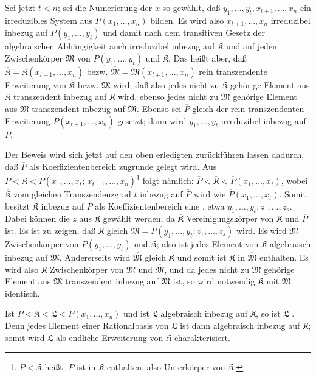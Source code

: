 Sei jetzt $t<n$; sei die Numerierung der $x$ so gewählt, daß $y_1,\ldots,y_t,x_{t+1},\ldots,x_n$ ein irreduzibles System aus $P(x_1,\ldots,x_n)$ bilden. Es wird also $x_{t+1},\ldots,x_n$ irreduzibel inbezug auf $P(y_1,\ldots,y_t)$ und damit nach dem transitiven Gesetz der algebraischen Abhängigkeit auch irreduzibel inbezug auf $\mathfrak K$ und auf jeden Zwischenkörper $\mathfrak M$ von $P(y_1,\ldots,y_t)$ und $\mathfrak K$. Das heißt aber, daß $\overline{\mathfrak K}=\mathfrak K(x_{t+1},\ldots,x_n)$ bezw. $\overline{\mathfrak M}=\mathfrak M(x_{t+1},\ldots,x_n)$ rein transzendente Erweiterung von $\mathfrak K$ bezw. $\mathfrak M$ wird; daß also jedes nicht zu $\mathfrak K$ gehörige Element aus $\overline{\mathfrak K}$ transzendent inbezug auf $\mathfrak K$ wird, ebenso jedes nicht zu $\mathfrak M$ gehörige Element aus $\overline{\mathfrak M}$ transzendent inbezug auf $\mathfrak M$. Ebenso sei $\overline P$ gleich der rein transzendenten Erweiterung $P(x_{t+1},\ldots,x_n)$ gesetzt; dann wird $y_1,\ldots,y_t$ irreduzibel inbezug auf $\overline P$.

Der Beweis wird sich jetzt auf den oben erledigten zurückführen lassen dadurch, daß $\overline P$ als Koeffizientenbereich zugrunde gelegt wird. Aus $P<\mathfrak K< P(x_1,\ldots,x_t;\,x_{t+1},\ldots,x_n)$\footnote{$P<\mathfrak K$ heißt: $P$ ist in $\mathfrak K$ enthalten, also Unterkörper von $\mathfrak K$.} folgt nämlich: $\overline P<\overline{\mathfrak K}<\overline P(x_1,\ldots,x_t)$, wobei $\overline{\mathfrak K}$ vom gleichen Transzendenzgrad $t$ inbezug auf $\overline P$ wird wie $\overline P(x_1,\ldots,x_t)$. Somit besitzt $\overline{\mathfrak K}$ inbezug auf $\overline P$ als Koeffizientenbereich eine , etwa $y_1,\ldots,y_t; z_1,\ldots,z_s$. Dabei können die $z$ aus $\mathfrak K$ gewählt werden, da $\overline{\mathfrak K}$ Vereinigungskörper von $\mathfrak K$ und $\overline P$ ist. Es ist zu zeigen, daß $\mathfrak K$ gleich $\mathfrak M=P(y_1,\ldots,y_t;z_1,\ldots,z_s)$ wird. Es wird $\mathfrak M$ Zwischenkörper von $P(y_1,\ldots,y_t)$ und $\mathfrak K$; also ist jedes Element von $\mathfrak K$ algebraisch inbezug auf $\mathfrak M$. Andererseits wird $\overline{\mathfrak M}$ gleich $\overline{\mathfrak K}$ und somit ist $\mathfrak K$ in $\overline{\mathfrak M}$ enthalten. Es wird also $\mathfrak K$ Zwischenkörper von $\mathfrak M$ und $\overline{\mathfrak M}$, und da jedes nicht zu $\mathfrak M$ gehörige Element aus $\overline{\mathfrak M}$ transzendent inbezug auf $\mathfrak M$ ist, so wird notwendig $\mathfrak K$ mit $\mathfrak M$ identisch.

 Ist $P<\mathfrak K<\mathfrak L<P(x_1,\ldots,x_n)$ und ist $\mathfrak L$ algebraisch inbezug auf $\mathfrak K$, so ist $\mathfrak L$ . Denn jedes Element einer Rationalbasis von $\mathfrak L$ ist dann algebraisch inbezug auf $\mathfrak K$; somit wird $\mathfrak L$ als endliche Erweiterung von $\mathfrak K$ charakterisiert.
